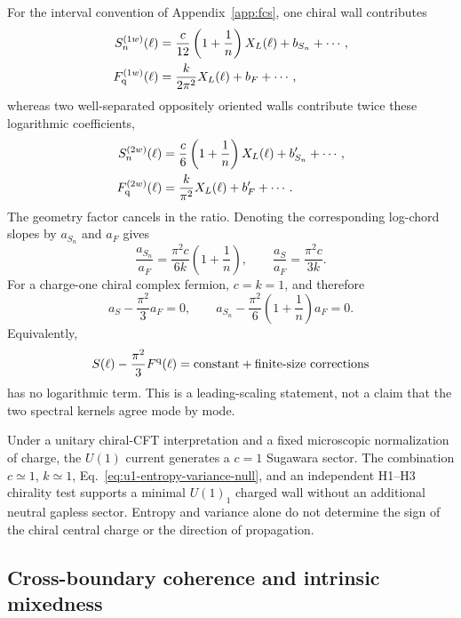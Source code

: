 \documentclass[aps,prx,twocolumn,floatfix,nofootinbib,superscriptaddress,longbibliography]{revtex4-2}
\begin{document}
For the interval convention of Appendix~\ref{app:fcs}, one chiral wall contributes
\begin{align}
 S_n^{(1w)}(\ell)
 &=\frac{c}{12}\left(1+\frac1n\right)X_L(\ell)+b_{S_n}+\cdots,\\
 F_{\rm q}^{(1w)}(\ell)
 &=\frac{k}{2\pi^2}X_L(\ell)+b_F+\cdots,
 \label{eq:one-wall-entropy-variance}
\end{align}
whereas two well-separated oppositely oriented walls contribute twice these logarithmic
coefficients,
\begin{align}
 S_n^{(2w)}(\ell)
 &=\frac{c}{6}\left(1+\frac1n\right)X_L(\ell)+b_{S_n}'+\cdots,\\
 F_{\rm q}^{(2w)}(\ell)
 &=\frac{k}{\pi^2}X_L(\ell)+b_F'+\cdots.
 \label{eq:two-wall-entropy-variance}
\end{align}
The geometry factor cancels in the ratio.  Denoting the corresponding log-chord slopes by
$a_{S_n}$ and $a_F$ gives
\begin{equation}
 \frac{a_{S_n}}{a_F}
 =\frac{\pi^2c}{6k}\left(1+\frac1n\right),
 \qquad
 \frac{a_S}{a_F}=\frac{\pi^2c}{3k}.
 \label{eq:general-entropy-variance-ratio}
\end{equation}
For a charge-one chiral complex fermion, $c=k=1$, and therefore
\begin{equation}
 a_S-\frac{\pi^2}{3}a_F=0,\qquad
 a_{S_n}-\frac{\pi^2}{6}\left(1+\frac1n\right)a_F=0.
 \label{eq:u1-entropy-variance-null}
\end{equation}
Equivalently,
\begin{equation}
 S(\ell)-\frac{\pi^2}{3}F^{\rm q}(\ell)
 =\text{constant}+\text{finite-size corrections}
 \label{eq:entropy-variance-constant-residual}
\end{equation}
has no logarithmic term.  This is a leading-scaling statement, not a claim that the two
spectral kernels agree mode by mode.

Under a unitary chiral-CFT interpretation and a fixed microscopic normalization of charge,
the $U(1)$ current generates a $c=1$ Sugawara sector.  The combination $c\simeq1$,
$k\simeq1$, Eq.~\eqref{eq:u1-entropy-variance-null}, and an independent H1--H3 chirality
test supports a minimal $U(1)_1$ charged wall without an additional neutral gapless
sector.  Entropy and variance alone do not determine the sign of the chiral central charge
or the direction of propagation.

\subsection{Cross-boundary coherence and intrinsic mixedness}
\end{document}
